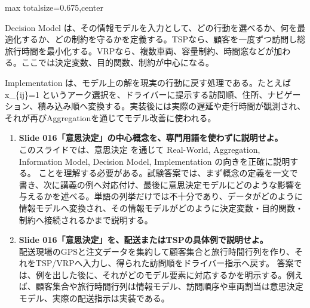\begin{adjustbox}{max totalsize={\textwidth}{0.675\textheight},center}
\begin{minipage}{\textwidth}
\begin{minipage}[t]{0.485\textwidth}
Decision Model は、その情報モデルを入力として、どの行動を選べるか、何を最適化するか、どの制約を守るかを定義する。TSPなら、顧客を一度ずつ訪問し総旅行時間を最小化する。VRPなら、複数車両、容量制約、時間窓などが加わる。ここでは決定変数、目的関数、制約が中心になる。\par
Implementation は、モデル上の解を現実の行動に戻す処理である。たとえば x\_\{ij\}=1 というアーク選択を、ドライバーに提示する訪問順、住所、ナビゲーション、積み込み順へ変換する。実装後には実際の遅延や走行時間が観測され、それが再びAggregationを通じてモデル改善に使われる。\par
{}
\begin{enumerate}
\item \textbf{Slide 016「意思決定」の中心概念を、専門用語を使わずに説明せよ。}\\このスライドでは、意思決定 を通じて Real-World, Aggregation, Information Model, Decision Model, Implementation の向きを正確に説明する。 ことを理解する必要がある。試験答案では、まず概念の定義を一文で書き、次に講義の例へ対応付け、最後に意思決定モデルにどのような影響を与えるかを述べる。単語の列挙だけでは不十分であり、データがどのように情報モデルへ変換され、その情報モデルがどのように決定変数・目的関数・制約へ接続されるかまで説明する。
\item \textbf{Slide 016「意思決定」を、配送またはTSPの具体例で説明せよ。}\\配送現場のGPSと注文データを集約して顧客集合と旅行時間行列を作り、それをTSP/VRPへ入力し、得られた訪問順をドライバー指示へ戻す。 答案では、例を出した後に、それがどのモデル要素に対応するかを明示する。例えば、顧客集合や旅行時間行列は情報モデル、訪問順序や車両割当は意思決定モデル、実際の配送指示は実装である。
\end{enumerate}
\end{minipage}
\end{minipage}
\end{adjustbox}

